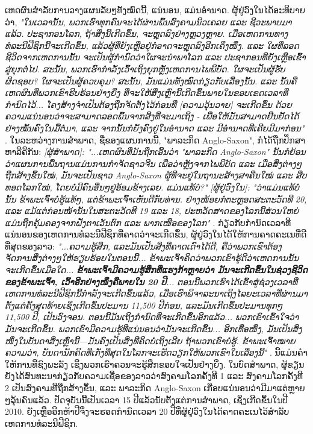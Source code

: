 \documentclass[10pt,twocolumn,letterpaper]{article}
\begin{document}
ເຫດຜົນສໍາລັບການວາງແຜນລັບໆທັງໝົດນີ້, ແນ່ນອນ, ແມ່ນອຳນາດ.
ຜູ້ຢູ່ວົງໃນໄດ້ອະທິບາຍວ່າ, \textit{"ໃນເວລານັ້ນ, ພວກ​ເຮົາ​ທຸກ​ຄົນ​ຈະ​ໄດ້​ຜ່ານ​ພົ້ນ​ສົງ​ຄາມ​ນິວ​ເຄລຍ ແລະ ຊີວະ​ພາບ​ມາ​ແລ້ວ. ປະຊາກອນໂລກ, ຖ້າສິ່ງນີ້ເກີດຂຶ້ນ, ຈະຫຼຸດລົງຢ່າງຫຼວງຫຼາຍ. ເມື່ອເຫດການທາງທໍລະນີຟີຊິກນີ້ຈະເກີດຂຶ້ນ, ແລ້ວຜູ້ທີ່ຍັງເຫຼືອຢູ່ກໍອາດຈະຫຼຸດລົງອີກເຄິ່ງໜຶ່ງ. ແລະ ໃຜທີ່ລອດຊີວິດຈາກເຫດການນັ້ນ ຈະເປັນຜູ້ກໍານົດວ່າໃຜຈະນຳພາໂລກ ແລະ ປະຊາກອນທີ່ຍັງເຫຼືອເຂົ້າສູ່ຍຸກຕໍ່ໄປ. ສະນັ້ນ, ພວກເຮົາກຳລັງເວົ້າເຖິງຍຸກຫຼັງເຫດການໄພພິບັດ. ໃຜຈະເປັນຜູ້ຮັບຜິດຊອບ? ໃຜຈະເປັນຜູ້ຄວບຄຸມ? ສະນັ້ນ, ມັນແມ່ນທັງໝົດກ່ຽວກັບເລື່ອງນັ້ນ. ແລະ ນັ້ນຄືເຫດຜົນທີ່ພວກເຂົາຮີບຮ້ອນຢ່າງຍິ່ງ ທີ່ຈະໃຫ້ສິ່ງເຫຼົ່ານີ້ເກີດຂຶ້ນພາຍໃນຂອບເຂດເວລາທີ່ກຳນົດໄວ້... ໂຄງສ້າງຈຳເປັນຕ້ອງຖືກຈັດຕັ້ງໄວ້ກ່ອນທີ່ [ຄວາມວຸ້ນວາຍ] ຈະເກີດຂຶ້ນ ດ້ວຍຄວາມແນ່ນອນວ່າຈະສາມາດລອດພົ້ນຈາກສິ່ງທີ່ຈະມາເຖິງ - ເພື່ອໃຫ້ມັນສາມາດຢືນຢັດໄດ້ຢ່າງໝັ້ນຄົງໃນມື້ຕໍ່ມາ, ແລະ ຈາກນັ້ນກໍຍັງຄົງຢູ່ໃນອຳນາດ ແລະ ມີອຳນາດທີ່ເຄີຍມີມາກ່ອນ"} \cite{4}. \cite{101}
ໃນລະຫວ່າງການສຳພາດ, ຊື່ຂອງແຜນການນີ້, "ພາລະກິດ Anglo-Saxon", ກໍໄດ້ຖືກປຶກສາຫາລືຄືກັນ: \textit{[ຜູ້ສຳພາດ]: "...ເຫດຜົນທີ່ມັນຖືກເອີ້ນວ່າ "ພາລະກິດ Anglo-Saxon" ນັ້ນກໍຍ້ອນວ່າແຜນການພື້ນຖານແມ່ນການກຳຈັດຊາວຈີນ ເພື່ອວ່າຫຼັງຈາກໄພພິບັດ ແລະ ເມື່ອສິ່ງຕ່າງໆຖືກສ້າງຂຶ້ນໃໝ່, ມັນຈະເປັນຊາວ Anglo-Saxon ຜູ້ທີ່ຈະຢູ່ໃນຖານະສ້າງສາຄືນໃໝ່ ແລະ ສືບທອດໂລກໃໝ່, ໂດຍບໍ່ມີຄົນອື່ນໆຢູ່ອ້ອມຂ້າງເລຍ. ແມ່ນແທ້ບໍ?"} \cite{102}
\textit{[ຜູ້ຢູ່ວົງໃນ]: "ວ່າແມ່ນແທ້ບໍ່ນັ້ນ ຂ້າພະເຈົ້າບໍ່ຮູ້ແທ້ໆ, ແຕ່ຂ້າພະເຈົ້າເຫັນດີກັບທ່ານ. ຢ່າງໜ້ອຍກໍຕະຫຼອດສະຕະວັດທີ 20, ແລະ  ແມ້ແຕ່ກ່ອນໜ້ານັ້ນໃນສະຕະວັດທີ 19 ແລະ 18, ປະຫວັດສາດຂອງໂລກນີ້ສ່ວນໃຫຍ່ແມ່ນຖືກຄຸ້ມຄອງຈາກຝັ່ງຕາເວັນຕົກ ແລະ ພາກເໜືອຂອງໂລກ"} \cite{4}. \cite{103}
ກ່ຽວກັບກຳນົດເວລາທີ່ແນ່ນອນຂອງເຫດການທໍລະນີຟີຊິກທີ່ຄາດວ່າຈະເກີດຂຶ້ນ, ຜູ້ຢູ່ວົງໃນໄດ້ໃຫ້ການຄາດຄະເນທີ່ດີທີ່ສຸດຂອງລາວ: \textit{"...ຄວາມຮູ້ສຶກ, ແລະມັນເປັນສິ່ງທີ່ຄາດເດົາໄດ້ດີ, ຄືວ່າພວກເຂົາຕ້ອງຈັດການສິ່ງຕ່າງໆໃຫ້ຮຽບຮ້ອຍໃນຕອນນີ້... ຂ້າພະເຈົ້າຄິດວ່າພວກເຂົາຮູ້ດີວ່າເຫດການນັ້ນຈະເກີດຂຶ້ນເມື່ອໃດ... \textbf{ຂ້າພະເຈົ້າມີຄວາມຮູ້ສຶກທີ່ແຮງກ້າຫຼາຍວ່າ ມັນຈະເກີດຂຶ້ນໃນຊ່ວງຊີວິດຂອງຂ້າພະເຈົ້າ, ເວົ້າອີກຢ່າງໜຶ່ງຄືພາຍໃນ 20 ປີ}... ຕອນນີ້ພວກເຮົາໄດ້ເຂົ້າສູ່ຊ່ວງເວລາທີ່ເຫດການທໍລະນີຟີຊິກນີ້ກຳລັງຈະເກີດຂຶ້ນແລ້ວ, ເມື່ອເຮົາພິຈາລະນາເຖິງໄລຍະເວລາທີ່ຜ່ານມາຕັ້ງແຕ່ຄັ້ງສຸດທ້າຍເຊິ່ງເກີດຂຶ້ນປະມານ 11,500 ປີກ່ອນ, ແລະມັນເກີດຂຶ້ນປະມານທຸກໆ 11,500 ປີ, ເປັນວົງຈອນ. ຕອນນີ້ມັນເຖິງກຳນົດທີ່ຈະເກີດຂຶ້ນອີກແລ້ວ... ພວກເຂົາເຂົ້າໃຈວ່າມັນຈະເກີດຂຶ້ນ. ພວກເຂົາມີຄວາມຮູ້ທີ່ແນ່ນອນວ່າມັນຈະເກີດຂຶ້ນ... ອີກເທື່ອໜຶ່ງ, ມັນເປັນສິ່ງໜຶ່ງໃນບັນດາສິ່ງເຫຼົ່ານີ້—ມັນຄົງເປັນສິ່ງທີ່ຄິດບໍ່ເຖິງເລີຍ ຖ້າພວກເຂົາບໍ່ຮູ້. ຂ້າພະເຈົ້າໝາຍຄວາມວ່າ, ບັນດານັກຄິດທີ່ເກັ່ງທີ່ສຸດໃນໂລກຈະເຮັດວຽກໃຫ້ພວກເຂົາໃນເລື່ອງນີ້"} \cite{4}. \cite{104}
ນີ້ແມ່ນຄຳໃຫ້ການທີ່ຊົງພະລັງ ເຊິ່ງພວກເຮົາຄວນຈະຮູ້ສຶກຂອບໃຈເປັນຢ່າງຍິ່ງ. ໃນບົດສໍາພາດ, ຜູ້ຂຽນຍັງໄດ້ສົນທະນາກ່ຽວກັບຄວາມເຊື່ອຂອງລາວວ່າສົງຄາມໂລກຄັ້ງທີ 1 ແລະ ສົງຄາມໂລກຄັ້ງທີ 2 ເປັນສົງຄາມທີ່ຖືກສ້າງຂຶ້ນ, ແລະ ພາລະກິດ Anglo-Saxon ເກືອບແນ່ນອນວ່າມີມາແຕ່ຫຼາຍໆລຸ້ນຄົນແລ້ວ. ປັດຈຸບັນນີ້ເປັນເວລາ 15 ປີແລ້ວນັບຕັ້ງແຕ່ການສໍາພາດ, ເຊິ່ງເກີດຂຶ້ນໃນປີ 2010. ຍັງເຫຼືອອີກຫ້າປີຈຶ່ງຈະຮອດກຳນົດເວລາ 20 ປີທີ່ຜູ້ຢູ່ວົງໃນໄດ້ຄາດຄະເນໄວ້ສຳລັບເຫດການທໍລະນີຟີຊິກ. \cite{105}
\end{document}
